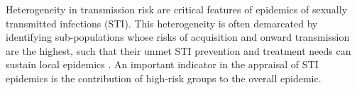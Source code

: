 

Heterogeneity in transmission risk are critical features of 
epidemics of sexually transmitted infections (STI). %
This heterogeneity is often demarcated by identifying
sub-populations whose risks of acquisition and onward transmission are the highest,
such that their unmet STI prevention and treatment needs
can sustain local epidemics \citep{Yorke1978,Gesink2011}.		%
An important indicator in the appraisal of STI epidemics is
the contribution of high-risk groups to the overall epidemic.  %

\par  %


